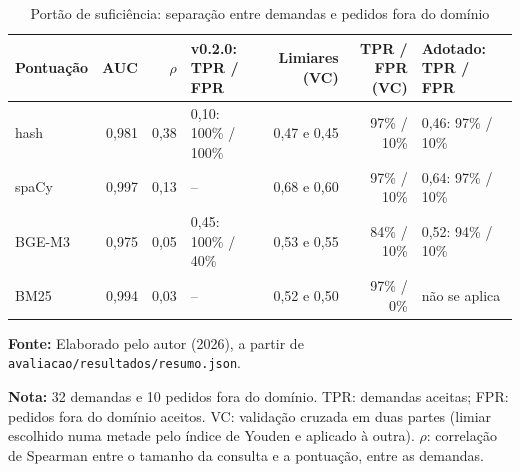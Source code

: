\begin{table}[htbp]
\caption{Portão de suficiência: separação entre demandas e pedidos fora do domínio}\label{tab:portao}
\centering\footnotesize
\setlength{\tabcolsep}{4pt}
\begin{tabular}{lrrlrrl}
\toprule
Pontuação & AUC & $\rho$ & v0.2.0: TPR / FPR & Limiares (VC) & TPR / FPR (VC) & Adotado: TPR / FPR \\
\midrule
hash & 0,981 & 0,38 & 0,10: 100\% / 100\% & 0,47 e 0,45 & 97\% / 10\% & 0,46: 97\% / 10\% \\
spaCy & 0,997 & 0,13 & -- & 0,68 e 0,60 & 97\% / 10\% & 0,64: 97\% / 10\% \\
BGE-M3 & 0,975 & 0,05 & 0,45: 100\% / 40\% & 0,53 e 0,55 & 84\% / 10\% & 0,52: 94\% / 10\% \\
BM25 & 0,994 & 0,03 & -- & 0,52 e 0,50 & 97\% / 0\% & não se aplica \\
\bottomrule
\end{tabular}
\par\smallskip
\begin{minipage}{\linewidth}{\small \textbf{Fonte:} Elaborado pelo autor (2026), a partir de \texttt{avaliacao/resultados/resumo.json}.}\par
{\small \textbf{Nota:} 32 demandas e 10 pedidos fora do domínio. TPR: demandas aceitas; FPR: pedidos fora do domínio aceitos. VC: validação cruzada em duas partes (limiar escolhido numa metade pelo índice de Youden e aplicado à outra). $\rho$: correlação de Spearman entre o tamanho da consulta e a pontuação, entre as demandas.}\end{minipage}
\end{table}
